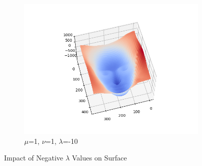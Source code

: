 \documentclass{article}
\begin{document}
\begin{figure}[H]
\begin{subfigure}{0.32\textwidth}
		\centering
		\includegraphics[width=\textwidth]{./src/2f_lambda_change/faceCalibrated_mu_1_v_1_lambda_-10.png}
		\caption{$\mu$=1, $\nu$=1, $\lambda$=-10}
	\end{subfigure}
	
	\caption{Impact of Negative $\lambda$ Values on Surface}
	\label{fig:l_n_uv}
\end{figure}
	
\end{document}
